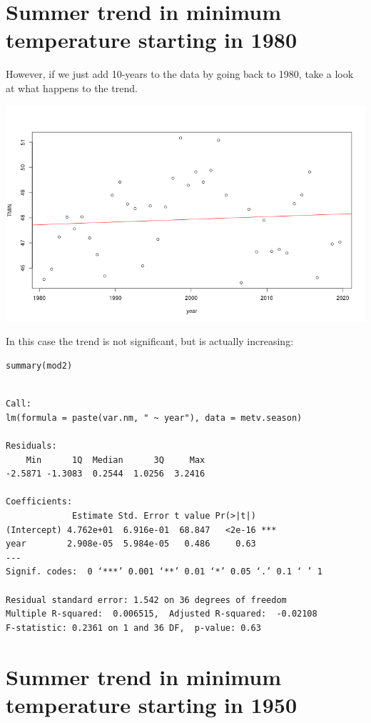 \documentclass[11pt]{article}
\begin{document}
\section{Summer trend in minimum temperature starting in 1980}
\label{sec:orgb6fe431}

However, if we just add 10-years to the data by going back to 1980, take a look
at what happens to the trend.

\begin{center}
\includegraphics[width=.9\linewidth]{summer_tmin_1980.png}
\end{center}

In this case the trend is not significant, but is actually increasing:

\begin{verbatim}
summary(mod2)
\end{verbatim}

\begin{verbatim}

Call:
lm(formula = paste(var.nm, " ~ year"), data = metv.season)

Residuals:
    Min      1Q  Median      3Q     Max 
-2.5871 -1.3083  0.2544  1.0256  3.2416 

Coefficients:
             Estimate Std. Error t value Pr(>|t|)    
(Intercept) 4.762e+01  6.916e-01  68.847   <2e-16 ***
year        2.908e-05  5.984e-05   0.486     0.63    
---
Signif. codes:  0 ‘***’ 0.001 ‘**’ 0.01 ‘*’ 0.05 ‘.’ 0.1 ‘ ’ 1

Residual standard error: 1.542 on 36 degrees of freedom
Multiple R-squared:  0.006515,	Adjusted R-squared:  -0.02108 
F-statistic: 0.2361 on 1 and 36 DF,  p-value: 0.63
\end{verbatim}

\section{Summer trend in minimum temperature starting in 1950}
\label{sec:orgbb9106f}
\end{document}
